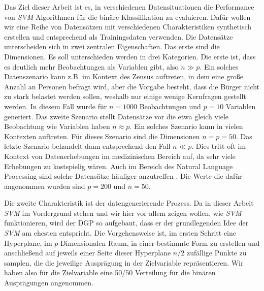 \documentclass[
]{article}
\begin{document}
Das Ziel dieser Arbeit ist es, in verschiedenen Datensituationen die
Performance von \textit{SVM} Algorithmen für die binäre Klassifikation
zu evaluieren. Dafür wollen wir eine Reihe von Datensätzen mit
verschiedenen Charakteristiken synthetisch erstellen und entsprechend
als Trainingsdaten verwenden. Die Datensätze unterscheiden sich in zwei
zentralen Eigenschaften. Das erste sind die Dimensionen. Es soll
unterschieden werden in drei Kategorien. Die erste ist, dass es deutlich
mehr Beobachtungen als Variablen gibt, also \(n \gg p\). Ein solches
Datenszenario kann z.B. im Kontext des Zensus auftreten, in dem eine
große Anzahl an Personen befragt wird, aber die Vorgabe besteht, dass
die Bürger nicht zu stark belastet werden sollen, weshalb nur einige
wenige Kernfragen gestellt werden. In diesem Fall wurde für \(n=1000\)
Beobachtungen und \(p=10\) Variablen generiert. Das zweite Szenario
stellt Datensätze vor die etwa gleich viele Beobachtung wie Variablen
haben \(n \approx p\). Ein solches Szenario kann in vielen Kontexten
auftreten. Für dieses Szenario sind die Dimensionen \(n=p=50\). Das
letzte Szenario behandelt dann entsprechend den Fall \(n \ll p\). Dies
tritt oft im Kontext von Datenerhebungen im medizinischen Bereich auf,
da sehr viele Erhebungen zu kostspielig wären. Auch im Bereich des
Natural Language Processing sind solche Datensätze häufiger anzutreffen
\parencite{scholzComparisonClassificationMethods2021}. Die Werte die
dafür angenommen wurden sind \(p=200\) und \(n=50\).

Die zweite Charakteristik ist der datengenerierende Prozess. Da in
dieser Arbeit \textit{SVM} im Vordergrund stehen und wir hier vor allem
zeigen wollen, wie \textit{SVM} funktionieren, wird der DGP so
aufgebaut, dass er der grundlegenden Idee der \textit{SVM} am ehesten
entspricht. Die Vorgehensweise ist, im ersten Schritt eine Hyperplane,
im \(p\)-Dimensionalen Raum, in einer bestimmte Form zu erstellen und
anschließend auf jeweils einer Seite dieser Hyperplane \(n/2\) zufällige
Punkte zu samplen, die die jeweilige Ausprägung in der Zielvariable
repräsentieren. Wir haben also für die Zielvariable eine 50/50
Verteilung für die binären Ausprägungen angenommen.
\end{document}
